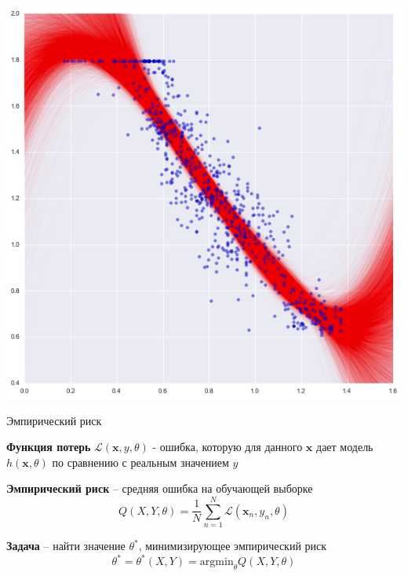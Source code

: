 \documentclass[aspectratio=169]{beamer}
\begin{document}
\begin{frame}
\begin{center}
\includegraphics[height=0.55\textheight]{images/tr_fit.png}
\end{center}

\end{frame}

\begin{frame}{Эмпирический риск}

{\bf Функция потерь} $\mathcal{L}(\mathbf{x}, y, \theta)$ - ошибка, которую для данного $\mathbf{x}$ дает модель $h(\mathbf{x}, \theta)$ по сравнению с реальным значением $y$
\vspace{1em}

{\bf Эмпирический риск} -- средняя ошибка на обучающей выборке
\[
Q(X, Y, \theta) = \frac{1}{N} \sum_{n=1}^N \mathcal{L}(\mathbf{x}_n, y_n, \theta)
\]
\vspace{1em}

{\bf Задача} -- найти значение $\theta^*$, минимизирующее эмпирический риск
\[
\theta^* = \theta^*(X, Y) = \text{argmin}_\theta Q(X, Y, \theta)
\]

\end{frame}
\end{document}

